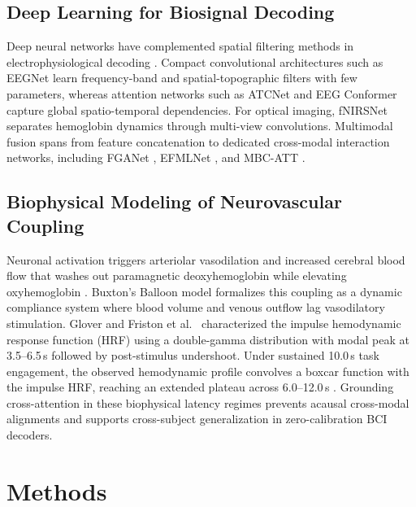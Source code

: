 \documentclass[journal]{IEEEtran}
\begin{document}
\subsection{Deep Learning for Biosignal Decoding}
Deep neural networks have complemented spatial filtering methods in electrophysiological decoding \cite{lotte2018review}. Compact convolutional architectures such as EEGNet \cite{lawhern2018eegnet} learn frequency-band and spatial-topographic filters with few parameters, whereas attention networks such as ATCNet \cite{altaheri2023atcnet} and EEG Conformer \cite{song2022eeg} capture global spatio-temporal dependencies. For optical imaging, fNIRSNet \cite{pandey2024fnirsnet} separates hemoglobin dynamics through multi-view convolutions. Multimodal fusion spans from feature concatenation \cite{chiarelli2018deep} to dedicated cross-modal interaction networks, including FGANet \cite{kwak2022fganet}, EFMLNet \cite{qiu2025efmlnet}, and MBC-ATT \cite{li2024mbcatt}.

\subsection{Biophysical Modeling of Neurovascular Coupling}
Neuronal activation triggers arteriolar vasodilation and increased cerebral blood flow that washes out paramagnetic deoxyhemoglobin while elevating oxyhemoglobin \cite{attwell2010glial, iadecola2004neurovascular}. Buxton's Balloon model \cite{buxton1998dynamics} formalizes this coupling as a dynamic compliance system where blood volume and venous outflow lag vasodilatory stimulation. Glover \cite{glover1999deconvolution} and Friston et al.\ \cite{friston1998event} characterized the impulse hemodynamic response function (HRF) using a double-gamma distribution with modal peak at 3.5--6.5\,s followed by post-stimulus undershoot. Under sustained 10.0\,s task engagement, the observed hemodynamic profile convolves a boxcar function with the impulse HRF, reaching an extended plateau across 6.0--12.0\,s \cite{strangman2002non, scholkmann2014review}. Grounding cross-attention in these biophysical latency regimes prevents acausal cross-modal alignments and supports cross-subject generalization in zero-calibration BCI decoders.

\section{Methods}
\label{sec:methods}
\end{document}
